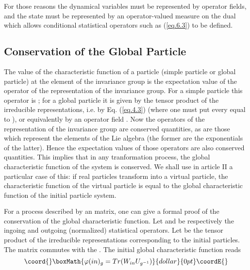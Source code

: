 \documentclass[a4paper,11pt]{article}
\begin{document}
For those reasons the dynamical variables must be represented by operator fields, and the state 
must be represented by an operator-valued measure on the dual which allows conditional 
statistical operators such as (\ref{eq.6.3}) to be defined.

\subsection{Conservation of the Global Particle}

The value of the characteristic function of a particle (simple particle or global particle) at 
the element \coordHE{} of the invariance group is the expectation value of the operator of the 
representation of the invariance group. For a simple particle this operator is \myHighlight{$\Ucg$}\coordHE{}; for 
a 
global particle it is given by the tensor product of the \coordHE{} irreducible representations, i.e. 
by 
Eq. (\ref{eq.4.3}) (where one must put every \coordHE{} equal to \coordHE{}), or equivalently by an 
operator field \myHighlight{$\chi \rightarrow \Ucg$}\coordHE{}. Now the operators of the representation of the 
invariance group are conserved 
quantities, as are those which represent the elements of the Lie algebra (the former are the 
exponentials of the latter). Hence the expectation values of those operators are also conserved 
quantities. This implies that in any tranformation process, the global characteristic function 
of the system is conserved. We shall use in article II a particular case of this: if \coordHE{} real 
particles transform into a virtual particle, the characteristic function of the virtual 
particle is equal to the global characteristic function of the initial \coordHE{} particle system. 

For a process described by an \coordHE{} matrix, one can give a formal proof of the conservation of 
the global characteristic function. Let \coordHE{} and \coordHE{} be respectively the ingoing and 
outgoing 
(normalized) statistical operators. Let \coordHE{} be the tensor product of the \coordHE{} irreducible 
representations corresponding to the \coordHE{} initial particles. The \coordHE{} matrix commutes with the 
\coordHE{} . The initial global characteristic function reads
$$\coord{}\boxMath{
    \phi(in)_g = Tr(W_{in} U_{g^{-1}})
}{dollar}{0pt}\coordE{}$$
\end{document}
